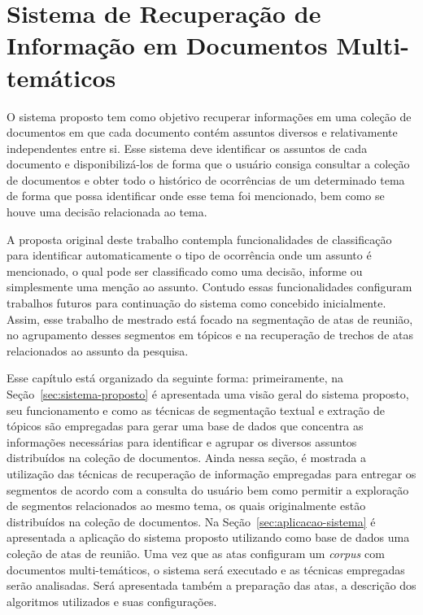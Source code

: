 \chapter{Sistema de Recuperação de Informação em Documentos Multi-temáticos}
\label{cap3}


O sistema proposto tem como objetivo recuperar informações em uma coleção de documentos em que cada documento contém assuntos diversos e relativamente independentes entre si. Esse sistema deve identificar os assuntos de cada documento e disponibilizá-los de forma que o usuário consiga consultar a coleção de documentos e obter todo o histórico de ocorrências de um determinado tema de forma que possa identificar onde esse tema foi mencionado, bem como se houve uma decisão relacionada ao tema.

A proposta original deste trabalho contempla funcionalidades de classificação para identificar automaticamente o tipo de ocorrência onde um assunto é mencionado, o qual pode ser classificado como uma decisão, informe ou simplesmente uma menção ao assunto. Contudo essas funcionalidades configuram trabalhos futuros para continuação do sistema como concebido inicialmente. Assim, esse trabalho de mestrado está focado na segmentação de atas de reunião, no agrupamento desses segmentos em tópicos e na recuperação de trechos de atas relacionados ao assunto da pesquisa.

Esse capítulo está organizado da seguinte forma: primeiramente, na Seção~\ref{sec:sistema-proposto} é apresentada uma visão geral do sistema proposto, seu funcionamento e como as técnicas de segmentação textual e extração de tópicos são empregadas para gerar uma base de dados que concentra as informações necessárias para identificar e agrupar os diversos assuntos distribuídos na coleção de documentos. Ainda nessa seção, é mostrada a utilização das técnicas de recuperação de informação empregadas para entregar os segmentos de acordo com a consulta do usuário bem como permitir a exploração de segmentos relacionados ao mesmo tema, os quais originalmente estão distribuídos na coleção de documentos.  
Na Seção~\ref{sec:aplicacao-sistema} é apresentada a aplicação do sistema proposto utilizando como base de dados uma coleção de atas de reunião. Uma vez que as atas configuram um \textit{corpus} com documentos multi-temáticos, o sistema será executado e as técnicas empregadas serão analisadas. Será apresentada também a preparação das atas, a descrição dos algoritmos utilizados e suas configurações.






